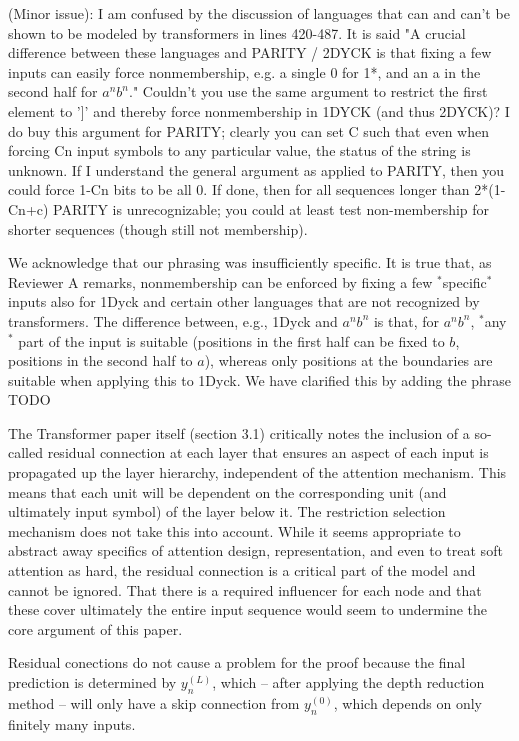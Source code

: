 \documentclass[11pt,a4paper]{article}
\newcommand\response[1]{{\color{blue}#1}}
\begin{document}
(Minor issue): I am confused by the discussion of languages that can and
can't be
shown to be modeled by transformers in lines 420-487. It is said "A
crucial difference between these languages and PARITY / 2DYCK is that
fixing a few inputs can easily force nonmembership, e.g. a single 0
for 1*, and an a in the second half for $a^n b^n$." Couldn't you use the
same argument to restrict the first element to ']' and thereby force
nonmembership in 1DYCK (and thus 2DYCK)? I do buy this
argument for PARITY; clearly you can set C such that even when forcing
Cn input symbols to any particular value, the status of the string is
unknown. If I understand the general argument as applied to PARITY,
then you could force 1-Cn bits to be all 0. If done, then for all
sequences longer than 2*(1-Cn+c) PARITY is unrecognizable; you could
at least test non-membership for shorter sequences (though still not
membership).

\response{We acknowledge that our phrasing was insufficiently specific. It is true that, as Reviewer A remarks, nonmembership can be enforced by fixing a few $^*$specific$^*$ inputs also for 1Dyck and certain other languages that are not recognized by transformers. The difference between, e.g., 1Dyck and $a^nb^n$ is that, for $a^nb^n$, $^*$any$^*$ part of the input is suitable (positions in the first half can be fixed to $b$, positions in the second half to $a$), whereas only positions at the boundaries are suitable when applying this to 1Dyck. We have clarified this by adding the phrase TODO}


The Transformer paper itself (section 3.1) critically notes the
inclusion of a so-called residual connection
at each layer that ensures an aspect of each input is propagated up the
layer
hierarchy, independent of the attention mechanism. This means that
each unit will be dependent on the corresponding unit (and ultimately
input symbol) of the layer below it. The restriction selection
mechanism does not take this into account. While it seems appropriate to
abstract away specifics of attention design, representation, and even
to treat soft attention as hard, the residual connection is a critical part
of the model and cannot be ignored. That there is a required
influencer for each node and that these cover ultimately the entire
input sequence would seem to undermine the core argument of this paper.

\response{Residual conections do not cause a problem for the proof because the final prediction is determined by $y_n^{(L)}$, which -- after applying the depth reduction method -- will only have a skip connection from $y_n^{(0)}$, which depends on only finitely many inputs.}
\end{document}

